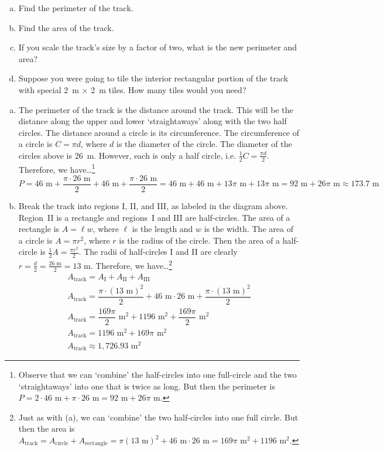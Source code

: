\documentclass[11pt,letterpaper]{article}
\begin{document}
\begin{enumerate}[(a)]
\item Find the perimeter of the track.
\item Find the area of the track.
\item If you scale the track's size by a factor of two, what is the new perimeter and area?
\item Suppose you were going to tile the interior rectangular portion of the track with special 2~m $\times$ 2~m tiles. How many tiles would you need?
\end{enumerate} \pspace

\sol 
\begin{enumerate}[(a)]
\item The perimeter of the track is the distance around the track. This will be the distance along the upper and lower `straightaways' along with the two half circles. The distance around a circle is its circumference. The circumference of a circle is $C= \pi d$, where $d$ is the diameter of the circle. The diameter of the circles above is 26~m. However, each is only a half circle, i.e. $\frac{1}{2}C= \frac{\pi d}{2}$. Therefore, we have\dots\footnote{Observe that we can `combine' the half-circles into one full-circle and the two `straightaways' into one that is twice as long. But then the perimeter is $P= 2 \cdot 46 \text{ m} + \pi \cdot 26 \text{ m}= 92 \text{ m} + 26 \pi \text{ m}$.}
	\[
	P= 46 \text{ m} + \dfrac{\pi \cdot 26 \text{ m}}{2} + 46 \text{ m} + \dfrac{\pi \cdot 26 \text{ m}}{2}= 46 \text{ m} + 46 \text{ m} + 13\pi \text{ m} + 13 \pi \text{ m}= 92 \text{ m} + 26 \pi \text{ m} \approx 173.7 \text{ m}
	\] \pspace

\item Break the track into regions I, II, and III, as labeled in the diagram above. Region~II is a rectangle and regions~I and III are half-circles. The area of a rectangle is $A= \ell w$, where $\ell$ is the length and $w$ is the width. The area of a circle is $A= \pi r^2$, where $r$ is the radius of the circle. Then the area of a half-circle is $\frac{1}{2}A= \frac{\pi r^2}{2}$. The radii of half-circles I and II are clearly $r= \frac{d}{2}= \frac{26 \text{ m}}{2}= 13 \text{ m}$. Therefore, we have\dots\footnote{Just as with (a), we can `combine' the two half-circles into one full circle. But then the area is $A_{\text{track}}= A_{\text{circle}} + A_{\text{rectangle}}= \pi (13 \text{ m})^2 + 46 \text{ m} \cdot 26 \text{ m}= 169 \pi \text{ m}^2 + 1196 \text{ m}^2$.}
	\[
	\begin{gathered}
	A_{\text{track}}= A_{\text{I}} + A_{\text{II}} + A_{\text{III}} \\
	A_{\text{track}}= \dfrac{\pi \cdot (13 \text{ m})^2}{2} + 46 \text{ m} \cdot 26 \text{ m} + \dfrac{\pi \cdot (13 \text{ m})^2}{2} \\
	A_{\text{track}}= \dfrac{169 \pi}{2} \text{ m}^2 + 1196 \text{ m}^2 + \dfrac{169 \pi}{2} \text{ m}^2 \\
	A_{\text{track}}= 1196 \text{ m}^2 + 169 \pi \text{ m}^2 \\
	A_{\text{track}} \approx 1,\!726.93 \text{ m}^2
	\end{gathered}
	\] \pspace


\end{enumerate}
\end{document}
